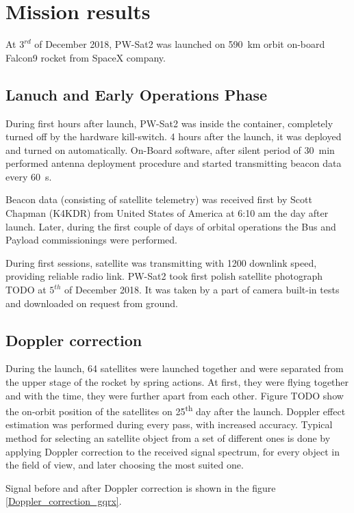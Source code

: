 \chapter{Mission results}
At $3^{rd}$ of December 2018, PW-Sat2 was launched on \SI{590}{\kilo\meter} orbit on-board Falcon9 rocket from SpaceX company. 

\section{Lanuch and Early Operations Phase}
During first hours after launch, PW-Sat2 was inside the container, completely turned off by the hardware kill-switch. 4 hours after the launch, it was deployed and turned on automatically. On-Board software, after silent period of \SI{30}{\minute} performed antenna deployment procedure and started transmitting beacon data every \SI{60}{\second}.

Beacon data (consisting of satellite telemetry) was received first by Scott Chapman (K4KDR) from United States of America at 6:10 am the day after launch. Later, during the first couple of days of orbital operations the Bus and Payload commissionings were performed.

During first sessions, satellite was transmitting with \SI{1200}{\bps} downlink speed, providing reliable radio link. PW-Sat2 took first polish satellite photograph TODO at $5^{th}$ of December 2018. It was taken by a part of camera built-in tests and downloaded on request from ground.


\section{Doppler correction}
During the launch, \si{64} satellites were launched together and were separated from the upper stage of the rocket by spring actions. At first, they were flying together and with the time, they were further apart from each other. Figure TODO show the on-orbit position of the satellites on \si{25^{th}} day after the launch. Doppler effect estimation was performed during every pass, with increased accuracy. Typical method for selecting an satellite object from a set of different ones is done by applying Doppler correction to the received signal spectrum, for every object in the field of view, and later choosing the most suited one. 

Signal before and after Doppler correction is shown in the figure \ref{Doppler_correction_gqrx}.

